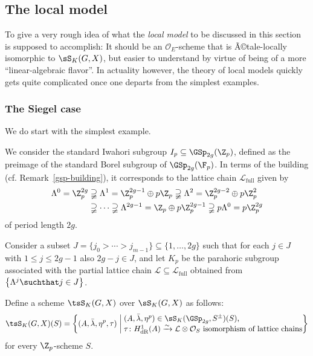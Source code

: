 \documentclass[a4paper]{scrartcl} %
\numberwithin{equation}{section}
\begin{document}
\subsection{The local model}
\label{sec:local-model}

To give a very rough idea of what the \emph{local model} to be discussed in this section is supposed to accomplish: It should be an $\mathcal{O}_E$-scheme that is Ã©tale-locally isomorphic to $\sS_K(G,X)$, but easier to understand by virtue of being of a more ``linear-algebraic flavor''.  In actuality however, the theory of local models quickly gets quite complicated once one departs from the simplest examples.


\subsubsection{The Siegel case}
\label{sec:siegel-case-loc-mod}

We do start with the simplest example.

We consider the standard Iwahori subgroup $I_p\subseteq\GSp_{2g}(\Z_p)$, defined as the preimage of the standard Borel subgroup of $\GSp_{2g}(\F_p)$.  In terms of the building (cf. Remark~\ref{gsp-building}), it corresponds to the lattice chain $\mathcal{L}_\mathrm{full}$ given by
\begin{equation}\label{eq:siegel-full-lattice-chain}
  \begin{aligned}
    \Lambda^0=\Z_p^{2g}
    &\supsetneqq \Lambda^1=\Z_p^{2g-1}\oplus p\Z_p
    \supsetneqq \Lambda^2=\Z_p^{2g-2}\oplus p\Z_p^2 \\
    &\supsetneqq \dotsb
    \supsetneqq \Lambda^{2g-1} = \Z_p\oplus p\Z_p^{2g-1}
    \supsetneqq p\Lambda^0=p\Z_p^{2g}
  \end{aligned}
\end{equation}
of period length $2g$.

Consider a subset $J=\{j_0>\dotsb>j_{m-1}\}\subseteq \{1,\dotsc,2g\}$ such that for each $j\in J$ with $1\leq j\leq 2g-1$ also $2g-j\in J$, and let $K_p$ be the parahoric subgroup associated with the partial lattice chain $\mathcal{L}\subseteq\mathcal{L}_\mathrm{full}$ obtained from $\left\{\Lambda^j \suchthat j\in J\right\}$. 

Define a scheme $\tsS_K(G,X)$ over $\sS_K(G,X)$ as follows:
\begin{equation*}
  \tsS_K(G,X)(S) =
\left\lbrace (A,\bar\lambda,\eta^p,\tau) \;\middle|\;
  \begin{tabular}{@{}l@{}}
    $(A,\bar\lambda,\eta^p)\in\sS_K(\GSp_{2g},S^\pm)(S)$, \\
    $\tau\colon H_\mathrm{dR}^1(A)\xrightarrow{\sim} \mathcal{L}\otimes\mathcal{O}_S$ isomorphism of lattice chains
   \end{tabular}
  \right\rbrace
\end{equation*}
for every $\Z_p$-scheme $S$.
\end{document}

